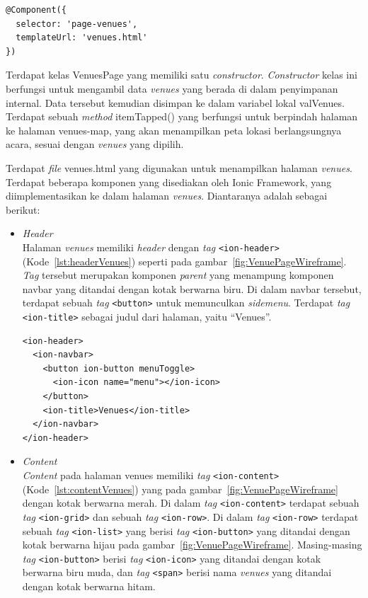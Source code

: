 \begin{enumerate}
\begin{enumerate}
\begin{lstlisting}[label={lst:componentVenues}, caption=@Component pada venues.ts]
@Component({
  selector: 'page-venues',
  templateUrl: 'venues.html'
})
\end{lstlisting}

	Terdapat kelas VenuesPage yang memiliki satu \textit{constructor}. \textit{Constructor} kelas ini berfungsi untuk mengambil data \textit{venues} yang berada di dalam penyimpanan internal. Data tersebut kemudian disimpan ke dalam variabel lokal valVenues. Terdapat sebuah \textit{method} itemTapped() yang berfungsi untuk berpindah halaman ke halaman venues-map, yang akan menampilkan peta lokasi berlangsungnya acara, sesuai dengan \textit{venues} yang dipilih.

	Terdapat \textit{file} venues.html yang digunakan untuk menampilkan halaman \textit{venues}. Terdapat beberapa komponen yang disediakan oleh Ionic Framework, yang diimplementasikan ke dalam halaman \textit{venues}. Diantaranya adalah sebagai berikut:	
	
	\begin{itemize}
		\item \textit{Header} \\
		Halaman \textit{venues} memiliki \textit{header} dengan \textit{tag} \texttt{<ion-header>} (Kode~\ref{lst:headerVenues}) seperti pada gambar~\ref{fig:VenuePageWireframe}. \textit{Tag} tersebut merupakan komponen \textit{parent} yang menampung komponen navbar yang ditandai dengan kotak berwarna biru. Di dalam navbar tersebut, terdapat sebuah \textit{tag} \texttt{<button>} untuk memunculkan \textit{sidemenu}. Terdapat \textit{tag} \texttt{<ion-title>} sebagai judul dari halaman, yaitu ``Venues''.
		
\begin{lstlisting}[label={lst:headerVenues}, caption=\textit{Header} pada venues.html]
<ion-header>
  <ion-navbar>
    <button ion-button menuToggle>
      <ion-icon name="menu"></ion-icon>
    </button>
    <ion-title>Venues</ion-title>
  </ion-navbar>
</ion-header>
\end{lstlisting}

		\item \textit{Content} \\
		\textit{Content} pada halaman venues memiliki \textit{tag} \texttt{<ion-content>} (Kode~\ref{lst:contentVenues}) yang pada gambar~\ref{fig:VenuePageWireframe} dengan kotak berwarna merah. Di dalam \textit{tag} \texttt{<ion-content>} terdapat sebuah \textit{tag} \texttt{<ion-grid>} dan sebuah \textit{tag} \texttt{<ion-row>}. Di dalam \textit{tag} \texttt{<ion-row>} terdapat sebuah \textit{tag} \texttt{<ion-list>} yang berisi \textit{tag} \texttt{<ion-button>} yang ditandai dengan kotak berwarna hijau pada gambar~\ref{fig:VenuePageWireframe}. Masing-masing \textit{tag} \texttt{<ion-button>} berisi \textit{tag} \texttt{<ion-icon>} yang ditandai dengan kotak berwarna biru muda, dan \textit{tag} \texttt{<span>} berisi nama \textit{venues} yang ditandai dengan kotak berwarna hitam. 
		

\end{itemize}
\end{enumerate}
\end{enumerate}
